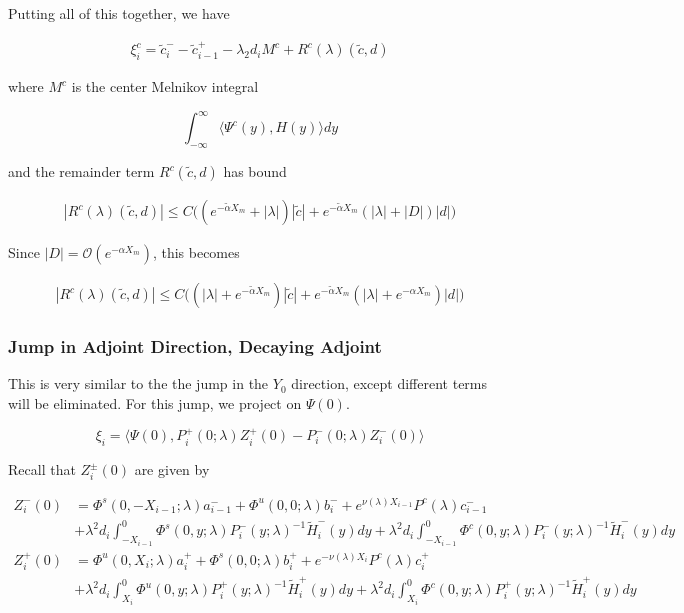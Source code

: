 \documentclass[12pt]{article}
\begin{document}
Putting all of this together, we have

\begin{align*}
\xi^c_i = \tilde{c}_i^- - \tilde{c}_{i-1}^+ - \lambda_2 d_i M^c + R^c(\lambda)(\tilde{c}, d)
\end{align*}

where $M^c$ is the center Melnikov integral

\[
\int_{-\infty}^\infty \langle \Psi^c(y), H(y) \rangle dy 
\]

and the remainder term $R^c(\tilde{c}, d)$ has bound

\begin{align*}
|R^c(\lambda)(\tilde{c}, d)| 
\leq C \Big( (e^{-\tilde{\alpha}X_m} + |\lambda|)|\tilde{c}| + e^{-\tilde{\alpha}X_m}(|\lambda| + |D|)|d| \Big)
\end{align*}

Since $|D| = \mathcal{O}(e^{-\alpha X_m})$, this becomes

\begin{align*}
|R^c(\lambda)(\tilde{c}, d)| 
\leq C \Big( (|\lambda| + e^{-\tilde{\alpha}X_m})|\tilde{c}| + e^{-\tilde{\alpha}X_m}(|\lambda| + e^{-\alpha X_m})|d| \Big)
\end{align*}


\subsubsection*{Jump in Adjoint Direction, Decaying Adjoint}

This is very similar to the the jump in the $Y_0$ direction, except different terms will be eliminated. For this jump, we project on $\Psi(0)$.

\[
\xi_i = \langle \Psi(0), P_i^+(0; \lambda) Z_i^+(0) - P_i^-(0; \lambda) Z_i^-(0) \rangle
\]

Recall that $Z_i^\pm(0)$ are given by

\begin{align*}
Z_i^-(0) &= \Phi^s(0, -X_{i-1}; \lambda) a_{i-1}^- + \Phi^u(0, 0; \lambda) b_i^- 
+ e^{\nu(\lambda) X_{i-1}} P^c(\lambda) c_{i-1}^- \\
&+ \lambda^2 d_i \int_{-X_{i-1}}^0 \Phi^s(0, y; \lambda) P_i^-(y; \lambda)^{-1} \tilde{H}_i^-(y) dy 
+ \lambda^2 d_i \int_{-X_{i-1}}^0 \Phi^c(0, y; \lambda) P_i^-(y; \lambda)^{-1} \tilde{H}_i^-(y) dy  \\ 
Z_i^+(0) &= \Phi^u(0, X_i; \lambda) a_i^+ + \Phi^s(0, 0; \lambda) b_i^+ + e^{-\nu(\lambda)X_i} P^c(\lambda) c_i^+ \\
&+ \lambda^2 d_i \int_{X_i}^0 \Phi^u(0, y; \lambda) P_i^+(y; \lambda)^{-1} \tilde{H}_i^+(y) dy 
+ \lambda^2 d_i \int_{X_i}^0 \Phi^c(0, y; \lambda) P_i^+(y; \lambda)^{-1} \tilde{H}_i^+(y) dy \\
\end{align*}
\end{document}
